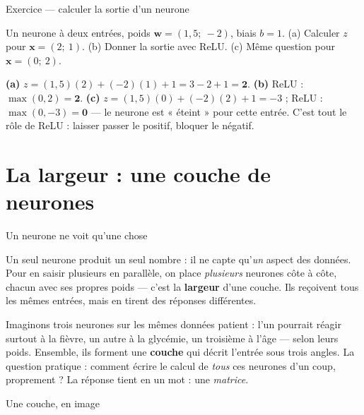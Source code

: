 \documentclass[aspectratio=169,11pt]{beamer}
\newcommand{\vx}{\mathbf{x}}
\newcommand{\vw}{\mathbf{w}}
\begin{document}
\begin{frame}{Exercice — calculer la sortie d'un neurone}
\begin{ucadrec}[Énoncé]
{\small Un neurone à deux entrées, poids $\vw = (1{,}5;\ -2)$, biais $b = 1$. (a) Calculer $z$ pour $\vx = (2;\ 1)$. (b) Donner la sortie avec ReLU. (c) Même question pour $\vx = (0;\ 2)$.}
\end{ucadrec}
\pause
\begin{ucadex}[Correction]
{\small \textbf{(a)} $z = (1{,}5)(2) + (-2)(1) + 1 = 3 - 2 + 1 = \mathbf{2}$. \textbf{(b)} ReLU : $\max(0, 2) = \mathbf{2}$. \textbf{(c)} $z = (1{,}5)(0) + (-2)(2) + 1 = -3$ ; ReLU : $\max(0, -3) = \mathbf{0}$ — le neurone est « éteint » pour cette entrée. C'est tout le rôle de ReLU : laisser passer le positif, bloquer le négatif.}
\end{ucadex}
\end{frame}

\section{La largeur : une couche de neurones}

\begin{frame}{Un neurone ne voit qu'une chose}
\begin{ucadfront}
{\small Un seul neurone produit un seul nombre : il ne capte qu'\emph{un} aspect des données. Pour en saisir plusieurs en parallèle, on place \emph{plusieurs} neurones côte à côte, chacun avec ses propres poids — c'est la \textbf{largeur} d'une couche. Ils reçoivent tous les mêmes entrées, mais en tirent des réponses différentes.}
\end{ucadfront}
{\small Imaginons trois neurones sur les mêmes données patient : l'un pourrait réagir surtout à la fièvre, un autre à la glycémie, un troisième à l'âge — selon leurs poids. Ensemble, ils forment une \textbf{couche} qui décrit l'entrée sous trois angles. La question pratique : comment écrire le calcul de \emph{tous} ces neurones d'un coup, proprement ? La réponse tient en un mot : une \emph{matrice}.}
\end{frame}

\begin{frame}{Une couche, en image}
\end{frame}
\end{document}
